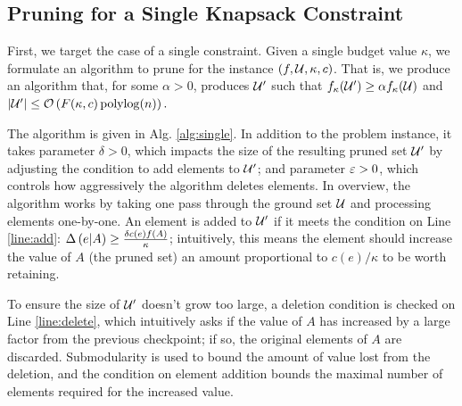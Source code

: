 \subsection{Pruning for a Single Knapsack Constraint} \label{sec:prune-single}
First, we target the case of a single constraint.
Given a single budget value $\kappa$, we formulate an algorithm to prune for the
instance $(f, \mathcal{U}, \kappa,c)$. That is, we produce an algorithm that, for some
$\alpha > 0$, produces $\mathcal{U}'$ such that $f_{\kappa}( \mathcal{U}' ) \ge \alpha  f_{\kappa }( \mathcal{U} )$
and $|\mathcal{U}'| \le \mathcal{O}\left( F( \kappa, c) \operatorname*{polylog}(n) \right). $

The algorithm \qss is given in Alg. \ref{alg:single}. In addition to the problem
instance, it takes parameter $\delta > 0$, which impacts the size of the resulting
pruned set $\mathcal{U}'$ by adjusting the condition to add elements to $\mathcal{U}'$;
and parameter $\varepsilon > 0$, which controls how aggressively the algorithm deletes elements.
In overview, the algorithm works by taking one pass through the ground set $\mathcal{U}$ and
processing elements one-by-one. An element is added to $\mathcal{U}'$ if it meets the condition
on Line \ref{line:add}: $\Delta \left( e | A \right) \ge \frac{ \delta c(e) f(A) }{ \kappa }$; intuitively,
this means the element should increase the value of $A$ (the pruned set)
an amount proportional to $c(e) / \kappa$ to be worth retaining.

To ensure the size of $\mathcal{U}'$ doesn't grow too large, a deletion condition is checked
on Line \ref{line:delete}, which intuitively asks if the value of $A$ has increased by
a large factor from the previous checkpoint; if so, the original elements of $A$ are
discarded. Submodularity is used to bound the amount of value lost from the deletion,
and the condition on element addition bounds the maximal number of elements required for
the increased value.

